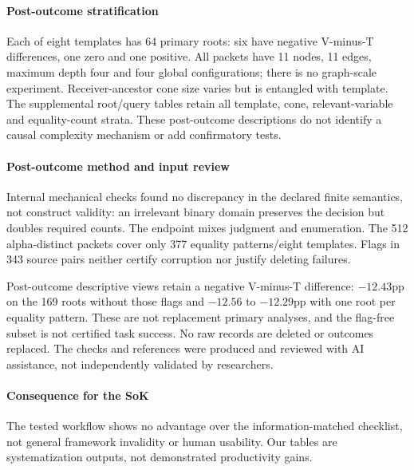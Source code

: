 \paragraph{Post-outcome stratification}
Each of eight templates has 64 primary roots: six have negative V-minus-T differences, one zero and one positive. All packets have 11 nodes, 11 edges, maximum depth four and four global configurations; there is no graph-scale experiment. Receiver-ancestor cone size varies but is entangled with template. The supplemental root/query tables retain all template, cone, relevant-variable and equality-count strata. These post-outcome descriptions do not identify a causal complexity mechanism or add confirmatory tests.

\paragraph{Post-outcome method and input review}
Internal mechanical checks found no discrepancy in the declared finite semantics, not construct validity: an irrelevant binary domain preserves the decision but doubles required counts. The endpoint mixes judgment and enumeration. The 512 alpha-distinct packets cover only 377 equality patterns/eight templates. Flags in 343 source pairs neither certify corruption nor justify deleting failures.

Post-outcome descriptive views retain a negative V-minus-T difference: $-12.43$pp on the 169 roots without those flags and $-12.56$ to $-12.29$pp with one root per equality pattern. These are not replacement primary analyses, and the flag-free subset is not certified task success. No raw records are deleted or outcomes replaced. The checks and references were produced and reviewed with AI assistance, not independently validated by researchers.

\paragraph{Consequence for the SoK}
The tested workflow shows no advantage over the information-matched checklist, not general framework invalidity or human usability. Our tables are systematization outputs, not demonstrated productivity gains.
